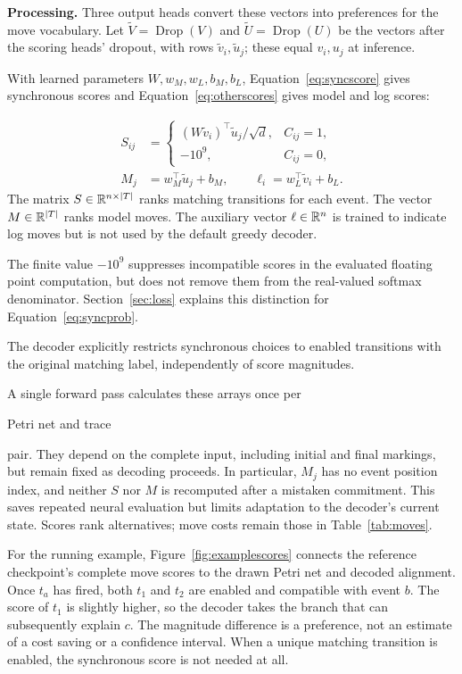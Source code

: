 \textbf{Processing.} Three output heads convert these vectors into preferences for the move vocabulary. Let $\widetilde V=\operatorname{Drop}(V)$ and $\widetilde U=\operatorname{Drop}(U)$ be the vectors after the scoring heads' dropout, with rows $\widetilde v_i,\widetilde u_j$; these equal $v_i,u_j$ at inference. \begin{revised}With learned parameters $W,w_M,w_L,b_M,b_L$, Equation~\eqref{eq:syncscore} gives synchronous scores and Equation~\eqref{eq:otherscores} gives model and log scores:\end{revised}
\begin{align}
 S_{ij}&=\begin{cases}(W\widetilde v_i)^\top\widetilde u_j/\sqrt d,&C_{ij}=1,\\-10^9,&C_{ij}=0,\end{cases}\label{eq:syncscore}\\
 M_j&=w_M^\top\widetilde u_j+b_M,\qquad \ell_i=w_L^\top\widetilde v_i+b_L.\label{eq:otherscores}
\end{align}
The matrix $S\in\mathbb{R}^{n\times|T|}$ ranks matching transitions for each event. The vector $M\in\mathbb{R}^{|T|}$ ranks model moves. The auxiliary vector $\ell\in\mathbb{R}^n$ is trained to indicate log moves but is not used by the default greedy decoder. \begin{revised}The finite value $-10^9$ suppresses incompatible scores in the evaluated floating point computation, but does not remove them from the real-valued softmax denominator. Section~\ref{sec:loss} explains this distinction for Equation~\eqref{eq:syncprob}.\end{revised} The decoder explicitly restricts synchronous choices to enabled transitions with the original matching label, independently of score magnitudes.

A single forward pass calculates these arrays once per \begin{revised}Petri net and trace\end{revised} pair. They depend on the complete input, including initial and final markings, but remain fixed as decoding proceeds. In particular, $M_j$ has no event position index, and neither $S$ nor $M$ is recomputed after a mistaken commitment. This saves repeated neural evaluation but limits adaptation to the decoder's current state. Scores rank alternatives; move costs remain those in Table~\ref{tab:moves}.

For the running example, Figure~\ref{fig:examplescores} connects the reference checkpoint's complete move scores to the drawn Petri net and decoded alignment. Once $t_a$ has fired, both $t_1$ and $t_2$ are enabled and compatible with event $b$. The score of $t_1$ is slightly higher, so the decoder takes the branch that can subsequently explain $c$. The magnitude difference is a preference, not an estimate of a cost saving or a confidence interval. When a unique matching transition is enabled, the synchronous score is not needed at all.

